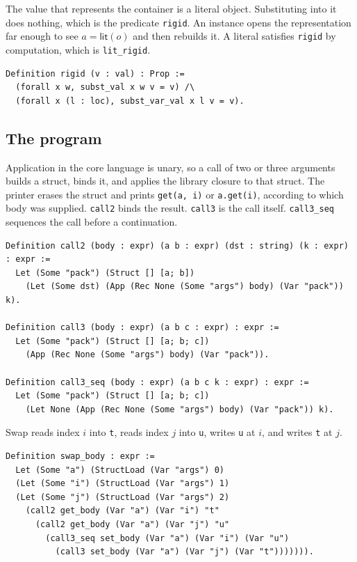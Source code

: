 \documentclass[11pt]{article}
\begin{document}
The value that represents the container is a literal object.
Substituting into it does nothing, which is the predicate \texttt{rigid}.
An instance opens the representation far enough to see \(a = \mathsf{lit}(o)\) and then rebuilds it.
A literal satisfies \texttt{rigid} by computation, which is \texttt{lit\_rigid}.

\begin{lstlisting}
Definition rigid (v : val) : Prop :=
  (forall x w, subst_val x w v = v) /\
  (forall x (l : loc), subst_var_val x l v = v).
\end{lstlisting}

\subsection{The program}

Application in the core language is unary, so a call of two or three arguments builds a struct, binds it, and applies the library closure to that struct.
The printer erases the struct and prints \texttt{get(a, i)} or \texttt{a.get(i)}, according to which body was supplied.
\texttt{call2} binds the result.
\texttt{call3} is the call itself.
\texttt{call3\_seq} sequences the call before a continuation.

\begin{lstlisting}
Definition call2 (body : expr) (a b : expr) (dst : string) (k : expr) : expr :=
  Let (Some "pack") (Struct [] [a; b])
    (Let (Some dst) (App (Rec None (Some "args") body) (Var "pack")) k).

Definition call3 (body : expr) (a b c : expr) : expr :=
  Let (Some "pack") (Struct [] [a; b; c])
    (App (Rec None (Some "args") body) (Var "pack")).

Definition call3_seq (body : expr) (a b c k : expr) : expr :=
  Let (Some "pack") (Struct [] [a; b; c])
    (Let None (App (Rec None (Some "args") body) (Var "pack")) k).
\end{lstlisting}

Swap reads index \(i\) into \texttt{t}, reads index \(j\) into \texttt{u}, writes \texttt{u} at \(i\), and writes \texttt{t} at \(j\).

\begin{lstlisting}
Definition swap_body : expr :=
  Let (Some "a") (StructLoad (Var "args") 0)
  (Let (Some "i") (StructLoad (Var "args") 1)
  (Let (Some "j") (StructLoad (Var "args") 2)
    (call2 get_body (Var "a") (Var "i") "t"
      (call2 get_body (Var "a") (Var "j") "u"
        (call3_seq set_body (Var "a") (Var "i") (Var "u")
          (call3 set_body (Var "a") (Var "j") (Var "t"))))))).
\end{lstlisting}
\end{document}
